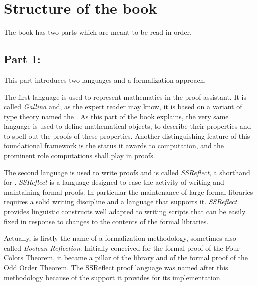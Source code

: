 \section*{Structure of the book}


The book has two parts which are meant to be
read in order.

\subsection*{Part 1: \partonename{}}

This part introduces two languages and a formalization approach.

The first language is used to represent mathematics in
the \Coq{} proof assistant. It is called \emph{Gallina} and, as the expert
reader may know, it is based on a variant of type theory named the
\mcbCIC{}. As this part of the book explains, the very same language is
used to define mathematical objects, to describe their properties and
to spell out the proofs of these properties. Another distinguishing
feature of this foundational framework is the status it awards to
computation, and the prominent role computations shall play in proofs.

The second language is used to write proofs and is called \emph{SSReflect},
a shorthand for \mcbSSR{}.
\emph{SSReflect} is a language designed to
ease the activity of writing and maintaining formal proofs.
In particular the maintenance of large
formal libraries requires a solid writing discipline
and a language that supports it.
\emph{SSReflect} provides linguistic constructs well adapted to
writing scripts that can be easily fixed in response to %
changes to the contents of the formal libraries.

Actually, \mcbSSR{} is firstly the name of a
formalization methodology, sometimes also called \emph{Boolean Reflection}.
Initially conceived for  the formal proof
of the Four Colors Theorem, it became a pillar of the \mcbMC{}
library and of the formal proof of the Odd Order
Theorem. The SSReflect proof language was named after this methodology
because of the support it provides for its implementation.

